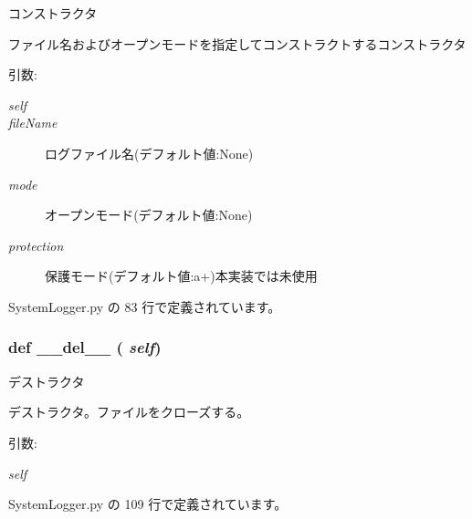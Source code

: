 コンストラクタ 

ファイル名およびオープンモードを指定してコンストラクトするコンストラクタ

\begin{Desc}
\item[引数:]
\begin{description}
\item[{\em self}]\item[{\em fileName}]ログファイル名(デフォルト値:None) \item[{\em mode}]オープンモード(デフォルト値:None) \item[{\em protection}]保護モード(デフォルト値:a+)本実装では未使用 \end{description}
\end{Desc}


 SystemLogger.py の 83 行で定義されています。
\subsubsection{\setlength{\rightskip}{0pt plus 5cm}def \_\-\_\-del\_\-\_\- ( {\em self})}\label{classsource__py_1_1_system_logger_1_1_logbuf_fa251912978c7d5ccf7e5a027a4d12ee}


デストラクタ 

デストラクタ。ファイルをクローズする。

\begin{Desc}
\item[引数:]
\begin{description}
\item[{\em self}]\end{description}
\end{Desc}


 SystemLogger.py の 109 行で定義されています。